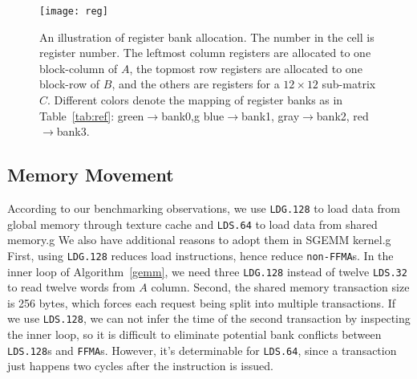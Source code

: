 \begin{figure}[htbp]
\begin{center}
\texttt{[image: reg]}
\caption{An illustration of register bank allocation. The number in the cell is register number.
    The leftmost column registers are allocated to one block-column of $A$, the
topmost row registers are allocated to one block-row of $B$, and the others are registers for
a $12 \times 12$ sub-matrix $C$. Different colors denote the mapping of register banks as in Table~\ref{tab:ref}: green$\rightarrow$bank0,g
blue$\rightarrow$bank1, gray$\rightarrow$bank2, red$\rightarrow$bank3.}
\label{fig:reg}
\end{center}
\end{figure}


\subsection{Memory Movement}
According to our benchmarking observations, we use {\tt LDG.128} to load data from global memory through texture cache
and {\tt LDS.64} to load data from shared memory.g
We also have additional reasons to adopt them in SGEMM kernel.g
First, using {\tt LDG.128} reduces load instructions, hence reduce {\tt non-FFMA}s. %
In the inner loop of Algorithm~\ref{gemm}, we need three {\tt LDG.128} instead of twelve {\tt LDS.32} to read twelve
words from $A$ column.
Second, the shared memory transaction size is 256 bytes, which forces each request being split into multiple transactions.
If we use {\tt LDS.128}, we can not infer the time of the second transaction by inspecting the inner loop, so it is
difficult to eliminate potential bank conflicts between {\tt LDS.128}s and {\tt FFMA}s.
However, it's determinable for {\tt LDS.64}, since a transaction just happens two cycles after the instruction is
issued. 


